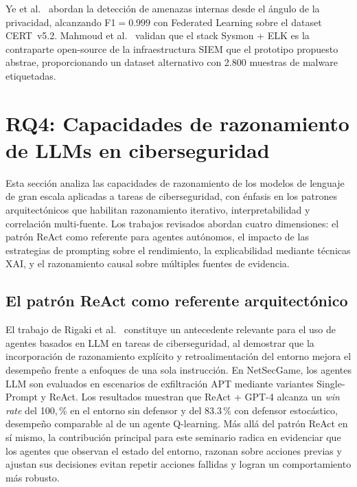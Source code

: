 Ye et al.~\cite{ye2025insider} abordan la detección de amenazas internas
desde el ángulo de la privacidad, alcanzando F1$=0.999$ con Federated
Learning sobre el dataset CERT~v5.2. Mahmoud et al.~\cite{mahmoud2024aau}
validan que el stack Sysmon + ELK es la contraparte open-source de la
infraestructura SIEM que el prototipo propuesto abstrae, proporcionando
un dataset alternativo con 2.800 muestras de malware etiquetadas.

\section{RQ4: Capacidades de razonamiento de LLMs en ciberseguridad}

Esta sección analiza las capacidades de razonamiento de los modelos
de lenguaje de gran escala aplicadas a tareas de ciberseguridad,
con énfasis en los patrones arquitectónicos que habilitan razonamiento
iterativo, interpretabilidad y correlación multi-fuente. Los trabajos
revisados abordan cuatro dimensiones: el patrón ReAct como referente
para agentes autónomos, el impacto de las estrategias de prompting
sobre el rendimiento, la explicabilidad mediante técnicas XAI, y el
razonamiento causal sobre múltiples fuentes de evidencia.

\subsection{El patrón ReAct como referente arquitectónico}

El trabajo de Rigaki et al.~\cite{rigaki2023cage} constituye un antecedente relevante para el uso de agentes basados en LLM en tareas de ciberseguridad, al demostrar que la incorporación de razonamiento explícito y retroalimentación del entorno mejora el desempeño frente a enfoques de una sola instrucción. En NetSecGame, los agentes LLM son evaluados en escenarios de exfiltración APT mediante variantes Single-Prompt y ReAct. Los resultados muestran que ReAct + GPT-4 alcanza un \textit{win rate} del 100,\,\% en el entorno sin defensor y del 83.3\,\% con defensor estocástico, desempeño comparable al de un agente Q-learning. Más allá del patrón ReAct en sí mismo, la contribución principal para este seminario radica en evidenciar que los agentes que observan el estado del entorno, razonan sobre acciones previas y ajustan sus decisiones evitan repetir acciones fallidas y logran un comportamiento más robusto.

